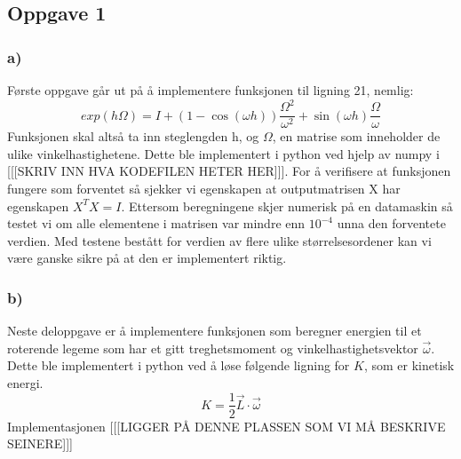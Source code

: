 \subsection{Oppgave 1}
\subsubsection{a)}
Første oppgave går ut på å implementere funksjonen til ligning 21, nemlig: 
\begin{equation}
    exp(h\Omega) = \textit{I} + (1 - \cos(\omega h))\frac{\Omega^2}{\omega^2}+\sin(\omega h)\frac{\Omega}{\omega}
\end{equation}
Funksjonen skal altså ta inn steglengden h, og $\Omega$, en matrise som inneholder de ulike vinkelhastighetene. Dette ble implementert i python ved hjelp av numpy i [[[SKRIV INN HVA KODEFILEN HETER HER]]]. For å verifisere at funksjonen fungere som forventet så sjekker vi egenskapen at outputmatrisen X har egenskapen $X^T X = I$. Ettersom beregningene skjer numerisk på en datamaskin så testet vi om alle elementene i matrisen var mindre enn $10^{-4}$ unna den forventete verdien. Med testene bestått for verdien av flere ulike størrelsesordener kan vi være ganske sikre på at den er implementert riktig.
\subsubsection{b)}
Neste deloppgave er å implementere funksjonen som beregner energien til et roterende legeme som har et gitt treghetsmoment og vinkelhastighetsvektor $\Vec{\omega}$. Dette ble implementert i python ved å løse følgende ligning for $K$, som er kinetisk energi.
\begin{equation}
    \textit{K} = \frac{1}{2}\vec{\textit{L}}\cdot \vec{\omega}
\end{equation}
Implementasjonen [[[LIGGER PÅ DENNE PLASSEN SOM VI MÅ BESKRIVE SEINERE]]]
